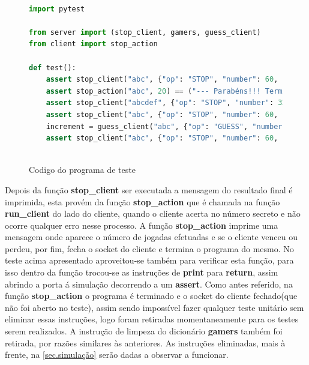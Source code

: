 \documentclass{report}
\newenvironment{changemargin}[2]{%
\begin{list}{}{%
\setlength{\topsep}{0pt}%
\setlength{\leftmargin}{#1}%
\setlength{\rightmargin}{#2}%
\setlength{\listparindent}{\parindent}%
\setlength{\itemindent}{\parindent}%
\setlength{\parsep}{\parskip}%
}%
\item[]}{\end{list}}
\theoremstyle{remark}
\begin{document}
\begin{figure}[H]\label{fig:fig33}
\begin{changemargin}{-3.5cm}{-3.5cm}
\begin{tcolorbox}
\begin{lstlisting}[language=Python, inputencoding=utf8, breaklines=true, basicstyle=\small, showstringspaces=false]

import pytest

from server import (stop_client, gamers, guess_client)
from client import stop_action

def test():
	assert stop_client("abc", {"op": "STOP", "number": 60, "attempts": 20}) == { "op": "STOP", "status":True, "guess": 60} 
	assert stop_action("abc", 20) == ("--- Parabéns!!! Terminou o jogo em 20 tentativas ---")
	assert stop_client("abcdef", {"op": "STOP", "number": 32, "attempts": 20}) == { "op": "STOP", "status":False, "error": "Cliente inexistente" }
	assert stop_client("abc", {"op": "STOP", "number": 60, "attempts": 8}) == { "op": "STOP", "status":False, "error": "Numero de jogadas inconsistente" }
	increment = guess_client("abc", {"op": "GUESS", "number": 50}) #para incrementar a contagem, para ser possivel realizar a proxima testagem
	assert stop_client("abc", {"op": "STOP", "number": 60, "attempts": 21}) == { "op": "STOP", "status":False, "error": "Excedeu o numero maximo de tentativas" }
	
\end{lstlisting}
\end{tcolorbox}
\caption{Codigo do programa de teste}
\end{changemargin}
\end{figure}

Depois da função \textbf{stop\_client} ser executada a mensagem do resultado final é imprimida, esta provém da função \textbf{stop\_action} que é chamada na função \textbf{run\_client} do lado do cliente, quando o cliente acerta no número secreto e não ocorre qualquer erro nesse processo. A função \textbf{stop\_action} imprime uma mensagem onde aparece o número de jogadas efetuadas e se o cliente venceu ou perdeu, por fim, fecha o socket do cliente e termina o programa do mesmo. No teste acima apresentado aproveitou-se também para verificar esta função, para isso dentro da função trocou-se as instruções de \textbf{print} para \textbf{return}, assim abrindo a porta á simulação decorrendo a um \textbf{assert}. Como antes referido, na função \textbf{stop\_action} o programa é terminado e o socket do cliente fechado(que não foi aberto no teste), assim sendo impossível fazer qualquer teste unitário sem eliminar essas instruções, logo foram retiradas momentaneamente para os testes serem realizados. A instrução de limpeza do dicionário \textbf{gamers} também foi retirada, por razões similares às anteriores. As instruções eliminadas, mais à frente, na \autoref{sec.simulação} serão dadas a observar a funcionar.
\end{document}
